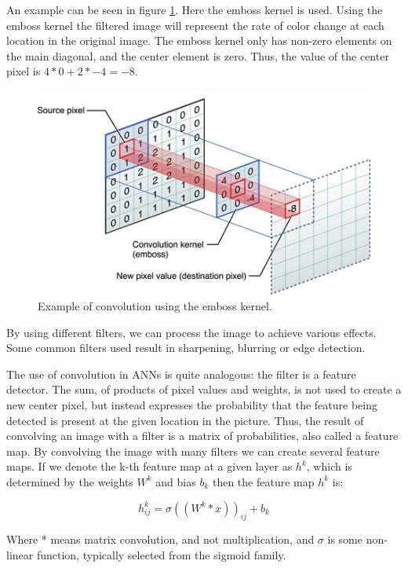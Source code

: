 \documentclass[11pt]{article}
\begin{document}
An example can be seen in figure \ref{fig:convolution}.  Here the emboss kernel is used.  Using the emboss kernel the filtered image will represent the rate of color change at each location in the original image.  The emboss kernel only has non-zero elements on the main diagonal, and the center element is zero.  Thus, the value of the center pixel is $4 * 0 + 2 * -4 = -8$.
\begin{figure}[htb!]
  \centering
  \includegraphics[width=\textwidth]{convolution.jpg}
  \caption{Example of convolution using the emboss kernel.}
  \label{fig:convolution}
\end{figure}

By using different filters, we can process the image to achieve various effects.  Some common filters used result in sharpening, blurring or edge detection.

The use of convolution in ANNs is quite analogous: the filter is a feature detector. The sum, of products of pixel values and weights, is not used to create a new center pixel, but instead expresses the probability that the feature being detected is present at the given location in the picture.  Thus, the result of convolving an image with a filter is a matrix of probabilities, also called a feature map.  By convolving the image with many filters we can create several feature maps.  If we denote the k-th feature map at a given layer as $h^k$, which is determined by the weights $W^k$ and bias $b_k$ then the feature map $h^k$ is:

\begin{displaymath}
  h^{k}_{ij} = \sigma((W^k * x))_{ij} + b_k
\end{displaymath}

Where * means matrix convolution, and not multiplication, and $\sigma$ is some non-linear function, typically selected from the sigmoid family.
\end{document}
